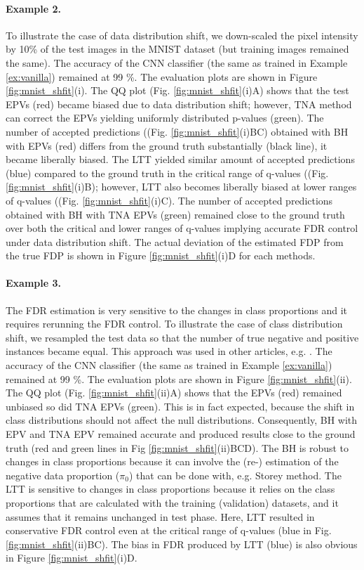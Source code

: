 \documentclass{article}
\begin{document}
\paragraph{Example 2.} To illustrate the case of data distribution shift, we down-scaled the pixel intensity by 10\% of the test images in the MNIST dataset (but training images remained the same). The accuracy of the CNN classifier (the same as trained in Example \ref{ex:vanilla}) remained at 99 \%. The evaluation plots are shown in Figure \ref{fig:mnist_shfit}(i). The QQ plot (Fig. \ref{fig:mnist_shfit}(i)A) shows that the test EPVs (red) became biased due to data distribution shift; however, TNA method can correct the EPVs yielding uniformly distributed p-values (green). The number of accepted predictions ((Fig. \ref{fig:mnist_shfit}(i)BC) obtained with BH with EPVs (red) differs from the ground truth substantially (black line), it became liberally biased. The LTT yielded similar amount of accepted predictions (blue) compared to the ground truth in the critical range of q-values ((Fig. \ref{fig:mnist_shfit}(i)B); however, LTT also becomes liberally biased at lower ranges of q-values ((Fig. \ref{fig:mnist_shfit}(i)C). The number of accepted predictions obtained with BH with TNA EPVs (green) remained close to the ground truth over both the critical and lower ranges of q-values implying accurate FDR control under data distribution shift. The actual deviation of the estimated FDP from the true FDP is shown in Figure \ref{fig:mnist_shfit}(i)D for each methods. 


\paragraph{Example 3.} The FDR estimation is very sensitive to the changes in class proportions and it requires rerunning the FDR control. To illustrate the case of class distribution shift, we resampled the test data so that the number of true negative and positive instances became equal. This approach was used in other articles, e.g.  \cite{joseph_d__viviano__2019}. The accuracy of the CNN classifier (the same as trained in Example \ref{ex:vanilla}) remained at 99 \%. The evaluation plots are shown in Figure \ref{fig:mnist_shfit}(ii). The QQ plot (Fig. \ref{fig:mnist_shfit}(ii)A) shows that the EPVs (red) remained unbiased so did TNA EPVs (green). This is in  fact expected, because the shift in class distributions should not affect the null distributions. Consequently, BH with EPV and TNA EPV remained accurate and produced results close to the ground truth (red and green lines in Fig \ref{fig:mnist_shfit}(ii)BCD). The BH is robust to changes in class proportions because it can involve the (re-) estimation of the negative data proportion ($\pi_0$) that can be done with, e.g. Storey method. The LTT is sensitive to changes in class proportions because it relies on the class proportions that are calculated with the training (validation) datasets, and it assumes that it remains unchanged in test phase. Here, LTT resulted in conservative FDR control even at the critical range of q-values (blue in Fig. \ref{fig:mnist_shfit}(ii)BC). The bias in FDR produced by LTT (blue) is also obvious in Figure \ref{fig:mnist_shfit}(i)D. 
\end{document}
